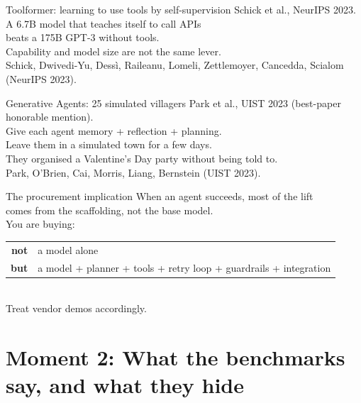 \documentclass[aspectratio=169, 12pt, xcolor={dvipsnames,table}]{beamer}
\begin{document}
\begin{frame}{Toolformer: learning to use tools by self-supervision}
  \vfill
  \centering
  {\large Schick et al., {\color{accent}NeurIPS 2023}.}\\[0.8em]
  {\Large A 6.7B model that teaches itself to call APIs}\\[0.3em]
  {\Large beats a {\color{accent}175B} GPT-3 without tools.}\\[1em]
  {\color{mute}Capability and model size are not the same lever.}\\[1em]
  {\scriptsize\color{mute}Schick, Dwivedi-Yu, Dess{\`i}, Raileanu, Lomeli, Zettlemoyer, Cancedda, Scialom (NeurIPS 2023).}
  \vfill
\end{frame}

\begin{frame}{Generative Agents: 25 simulated villagers}
  \vfill
  \centering
  {\large Park et al., {\color{accent}UIST 2023} (best-paper honorable mention).}\\[0.8em]
  {\Large Give each agent memory + reflection + planning.}\\[0.4em]
  {\Large Leave them in a simulated town for a few days.}\\[1em]
  {\color{mute}They organised a Valentine's Day party without being told to.}\\[1em]
  {\scriptsize\color{mute}Park, O'Brien, Cai, Morris, Liang, Bernstein (UIST 2023).}
  \vfill
\end{frame}

\begin{frame}{The procurement implication}
  \vfill
  \centering
  {\Large When an agent succeeds, most of the lift}\\[0.2em]
  {\Large comes from the {\color{accent}scaffolding}, not the base model.}\\[1.5em]
  {\color{mute}You are buying:}\\[0.5em]
  \begin{tabular}{rl}
    \textbf{not} & a model alone\\[0.2em]
    \textbf{but} & a model + planner + tools + retry loop + guardrails + integration\\
  \end{tabular}\\[1em]
  {\color{mute}Treat vendor demos accordingly.}
  \vfill
\end{frame}

\section{Moment 2: What the benchmarks say, and what they hide}
\end{document}
